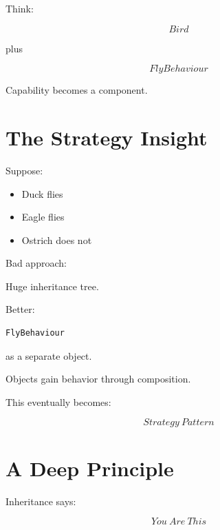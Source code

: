 \documentclass[11pt,a4paper]{book}
\begin{document}
Think:

\[
Bird
\]

plus

\[
FlyBehaviour
\]


Capability becomes a component.


\section{The Strategy Insight}

Suppose:

\begin{itemize}
\item Duck flies
\item Eagle flies
\item Ostrich does not
\end{itemize}


Bad approach:

Huge inheritance tree.


Better:

\begin{verbatim}
FlyBehaviour
\end{verbatim}

as a separate object.


Objects gain behavior through composition.


This eventually becomes:

\[
Strategy\ Pattern
\]


\section{A Deep Principle}

Inheritance says:

\[
You\ Are\ This
\]

\end{document}
